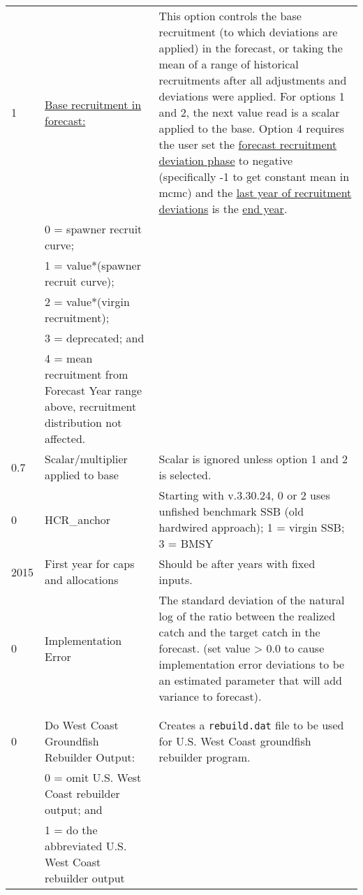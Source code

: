 \begin{landscape}
{\begin{longtable}{p{2cm} p{7cm} p{12cm}}
  \hline
  1 \Tstrut & \hyperlink{ForeSpawn}{Base recruitment in forecast:} \hypertarget{FcastRecruitment}{} & \multirow{1}{1cm}[-0.25cm]{\parbox{12cm}{This option controls the base recruitment (to which deviations are applied) in the forecast, or taking the mean of a range of historical recruitments after all adjustments and deviations were applied. For options 1 and 2, the next value read is a scalar applied to the base. Option 4 requires the user set the \hyperlink{FcastRecDevPhase}{forecast recruitment deviation phase} to negative (specifically -1 to get constant mean in \gls{mcmc}) and the \hyperlink{RecDevEndYear}{last year of recruitment deviations} is the \hyperlink{EndYear}{end year}.}} \\
    & 0 = spawner recruit curve; & \\
    & 1 = value*(spawner recruit curve); & \\
    & 2 = value*(virgin recruitment); & \\
    & 3 = deprecated; and & \\
    & 4 = mean recruitment from Forecast Year range above, recruitment distribution not affected. & \Bstrut\\

  \hline
  0.7 \Tstrut & Scalar/multiplier applied to base & \multirow{1}{1cm}[-0.05cm]{\parbox{12cm}{Scalar is ignored unless option 1 and 2 is selected.}} \Bstrut\\

  \hline
  0 & HCR\_anchor & Starting with v.3.30.24, 0 or 2 uses unfished benchmark SSB (old hardwired approach); 1 = virgin SSB; 3 = BMSY \Tstrut\Bstrut\\
  
  \hline
  2015 \Tstrut & First year for caps and allocations & \multirow{1}{1cm}[-0.10cm]{\parbox{12cm}{Should be after years with fixed inputs.}} \Bstrut\\

  \hline
  0 \Tstrut & Implementation Error & \multirow{1}{1cm}[-0.2cm]{\parbox{12cm}{The standard deviation of the natural log of the ratio between the realized catch and the target catch in the forecast. (set value > 0.0 to cause implementation error deviations to be an estimated parameter that will add variance to forecast).}} \Bstrut\\
    & & \Bstrut\\
    & & \Bstrut\\

  \hline
  0 \Tstrut & Do West Coast Groundfish Rebuilder Output: &\multirow{1}{1cm}[-0.2cm]{\parbox{12cm}{Creates a \texttt{rebuild.dat} file to be used for U.S. West Coast groundfish rebuilder program.}} \\
    & 0 = omit U.S. West Coast rebuilder output; and & \\
    & 1 = do the abbreviated U.S. West Coast rebuilder output \Bstrut\\


\end{longtable}}
\end{landscape}
